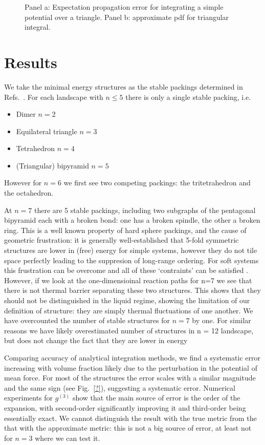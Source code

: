 \documentclass[11pt,twoside]{report}
\begin{document}
\begin{figure}
  \missingfigure[figwidth=\linewidth]{}
  \caption{Panel a: Expectation propagation error for integrating a simple potential over a triangle.
  Panel b: approximate pdf for triangular integral.}
\end{figure}

\section{Results}

We take the minimal energy structures as the stable packings determined in Refs.\ \cite{ArkusPRL2009,Holmes-CerfonSR2016}.
For each landscape with $n \le 5$ there is only a single stable packing, i.e.\
\begin{itemize}
\item Dimer $n=2$
\item Equilateral triangle $n=3$
\item Tetrahedron $n=4$
\item (Triangular) bipyramid $n=5$
\end{itemize}
However for $n = 6$ we first see two competing packings: the tritetrahedron and the octahedron.

At $n = 7$ there are 5 stable packings, including two subgraphs of the pentagonal bipyramid each with a broken bond: one has a broken spindle, the other a broken ring.
This is a well known property of hard sphere packings, and the cause of geometric frustration: it is generally well-established \cite{?,?,?,Robinson?} that 5-fold symmetric structures are lower in (free) energy for simple systems, however they do not tile space perfectly leading to the suppresion of long-range ordering.
For soft systems this frustration can be overcome and all of these `contraints' can be satisfied \cite{Frank,Wales}.
However, if we look at the one-dimensioinal reaction paths for n=7 we see that there is not thermal barrier separating these two structures.
This shows that they should not be distinguished in the liquid regime, showing the limitation of our definition of structure: they are simply thermal fluctuations of one another.
We have overcounted the number of stable structures for $n=7$ by one.
For similar reasons we have likely overestimated number of structures in n = 12 landscape, but does not change the fact that they are lower in energy

Comparing accuracy of analytical integration methods, we find a systematic error increasing with volume fraction likely due to the perturbation in the potential of mean force.
For most of the structures the error scales with a similar magnitude and the same sign (see Fig.\ \ref{?}), suggesting a systematic error.
Numerical experiments for $g^{(3)}$ show that the main source of error is the order of the expansion, with second-order significantly improving it and third-order being essentially exact.
We cannot distinguish the result with the true metric from the that with the approximate metric: this is not a big source of error, at least not for $n=3$ where we can test it.
\end{document}
